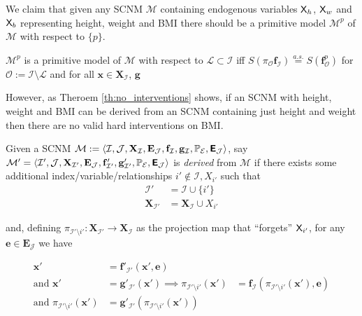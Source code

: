 We claim that given any SCNM $\mathcal{M}$ containing endogenous variables $\mathsf{X}_{h}$, $\mathsf{X}_w$ and $\mathsf{X}_{b}$ representing height, weight and BMI there should be a primitive model $\mathcal{M}^p$ of $\mathcal{M}$ with respect to $\{p\}$.

\begin{lemma}
$\mathcal{M}^p$ is a primitive model of $\mathcal{M}$ with respect to $\mathcal{L}\subset \mathcal{I}$ iff $S(\pi_{\mathcal{O}} \mathbf{f}_{\mathcal{I}})\overset{a.s.}{=}S(\mathbf{f}^p_{\mathcal{O}})$ for $\mathcal{O}:=\mathcal{I}\setminus\mathcal{L}$ and for all $\mathbf{x}\in \mathbf{X}_{\mathcal{I}}$, $\mathbf{g}$

\end{lemma}

However, as Theroem \ref{th:no_interventions} shows, if an SCNM with height, weight and BMI can be derived from an SCNM containing just height and weight then there are no valid hard interventions on BMI.

\begin{definition}
Given a SCNM $\mathcal{M}:=\langle \mathcal{I},\mathcal{J},\mathbf{X}_{\mathcal{I}},\mathbf{E}_{\mathcal{J}},\mathbf{f}_{\mathcal{I}},\mathbf{g}_{\mathcal{I}},\mathbb{P}_{\mathcal{E}},\bm{\mathsf{E}}_{\mathcal{J}}\rangle$, say $\mathcal{M}'=\langle \mathcal{I}',\mathcal{J},\mathbf{X}_{\mathcal{I}'},\mathbf{E}_{\mathcal{J}},\mathbf{f}'_{\mathcal{I}'},\mathbf{g}'_{\mathcal{I}'},\mathbb{P}_{\mathcal{E}},\bm{\mathsf{E}}_{\mathcal{J}}\rangle$ is \emph{derived} from $\mathcal{M}$ if there exists some additional index/variable/relationships $i'\not\in\mathcal{I},X_{i'}$ such that
\begin{align}
	\mathcal{I}' &= \mathcal{I}\cup\{i'\}\\
	\mathbf{X}_{\mathcal{I}'} &= \mathbf{X}_{\mathcal{I}}\cup X_{i'}
\end{align}

and, defining $\pi_{\mathcal{I'}\setminus{i'}}:\mathbf{X}_{\mathcal{I'}}\to \mathbf{X}_{\mathcal{I}}$ as the projection map that ``forgets'' $\mathsf{X}_{i'}$, for any $\mathbf{e}\in\mathbf{E}_{\mathcal{J}}$ we have

\begin{align}
	\mathbf{x}'&=\mathbf{f}'_{\mathcal{I}'}(\mathbf{x}',\mathbf{e})\\
	\text{and } \mathbf{x}'&=\mathbf{g}'_{\mathcal{I}'}(\mathbf{x}')
	\implies \pi_{\mathcal{I'}\setminus{i'}}(\mathbf{x}')&=\mathbf{f}_{\mathcal{I}}(\pi_{\mathcal{I'}\setminus{i'}}(\mathbf{x}'),\mathbf{e})\\
	\text{and } \pi_{\mathcal{I'}\setminus{i'}}(\mathbf{x}')&=\mathbf{g}'_{\mathcal{I}'}(\pi_{\mathcal{I'}\setminus{i'}}(\mathbf{x}'))
\end{align}
\end{definition}

